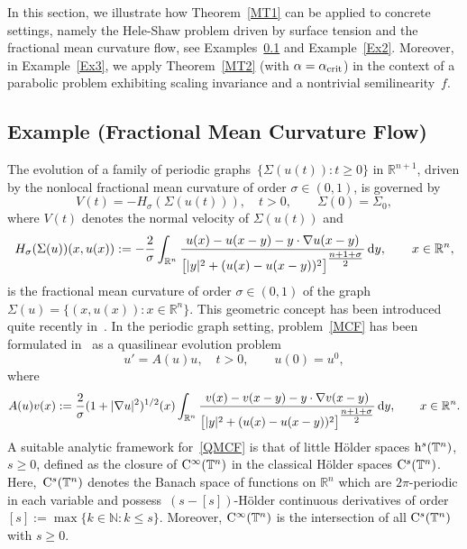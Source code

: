 \documentclass[reqno,11pt]{amsart}
\numberwithin{equation}{section}
\newcommand{\R}{\mathbb{R}}
\theoremstyle{remark}
\begin{document}
In this section, we illustrate how Theorem~\ref{MT1} can be applied to concrete settings, 
namely the Hele-Shaw problem driven by surface tension and the fractional mean curvature flow, see Examples~\ref{Ex1} and Example~\ref{Ex2}. 
Moreover,  in Example~\ref{Ex3}, we apply Theorem~\ref{MT2} (with $\alpha = \alpha_{\rm crit}$) in the context 
of a parabolic problem exhibiting scaling invariance and a nontrivial semilinearity~$f$.


\subsection{Example (Fractional Mean Curvature Flow)}\label{Ex1} 
The evolution of a  family of periodic graphs~${\{\Sigma(u(t)) : t \ge 0\}}$ in $\mathbb{R}^{n+1}$,
driven by the nonlocal fractional mean curvature of order $\sigma \in (0,1)$, is governed by
\begin{equation}\label{MCF}
    V(t) = - H_\sigma(\Sigma(u(t))), \quad t>0,  \qquad \Sigma(0)=\Sigma_0,
\end{equation}
where $V(t)$ denotes the normal velocity of $\Sigma(u(t))$ and
\begin{align*}
    H_\sigma(\Sigma(u))(x,u(x)):= -\frac{2}{\sigma}\int_{\mathbb{R}^n}
        \frac{u(x)-u(x-y)- y \cdot \nabla u(x-y)}{\big[|y|^2 + (u(x)-u(x-y))^2\big]^{\tfrac{n+1+\sigma}{2}}}\, {\rm d}y, \qquad x \in \mathbb{R}^n,
\end{align*}
is the fractional mean curvature of order $\sigma \in (0,1)$ of the graph~${\Sigma(u)=\{(x,u(x)) : x\in\mathbb{R}^n\}}$. This geometric concept has been introduced quite recently in~\cite{CaffarelliSouganidis10}.
In the  periodic graph setting,  problem~\eqref{MCF} has been formulated in~\cite{MW_2025_Annali}  as a quasilinear  evolution  problem
\begin{equation}\label{QMCF}
u'=A(u)u, \quad t>0,\qquad u(0)=u^0,
\end{equation}
where 
\begin{equation*}
A(u)v(x):=\frac{2}{\sigma}(1+|\nabla u|^2)^{1/2}(x)\int_{\R^n} \frac{v(x)-v(x-y)-y\cdot\nabla v(x-y)}{\big[|y|^2+(u(x)-u(x-y))^2\big]^{\tfrac{n+1+\sigma}{2}}}\,{\rm d}y,\qquad x\in\R^n.
\end{equation*}
A suitable analytic framework for~\eqref{QMCF} is that of  little H\"older spaces ${\rm h}^{s}(\mathbb{T}^n)$, $s\geq0$, defined as the closure of  
${\rm C}^{\infty}(\mathbb{T}^n)$  in the classical H\"older spaces ${\rm C}^{s}(\mathbb{T}^n)$. 
Here,~${\rm C}^{s}(\mathbb{T}^n)$ denotes the Banach space of functions on $\mathbb{R}^n$ which are $2\pi$-periodic in each variable and possess~$(s-[s])$-H\"older continuous derivatives of order 
$[s]:=\max\{k\in\mathbb{N}: k\leq s\}$. 
Moreover, ${\rm C}^{\infty}(\mathbb{T}^n)$ is the intersection of all ${\rm C}^{s}(\mathbb{T}^n)$ with $s\geq 0$. 
\end{document}
